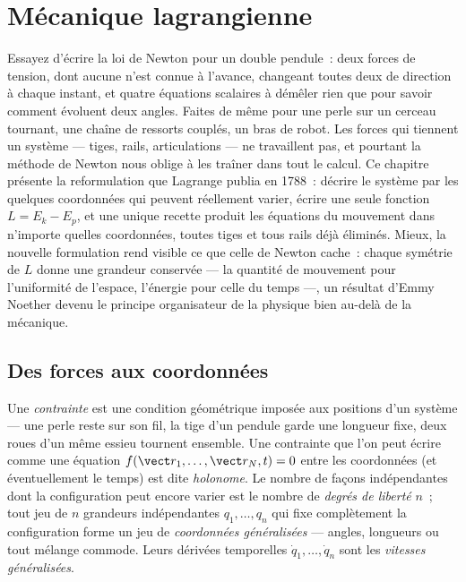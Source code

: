 \chapter{Mécanique lagrangienne}\label{ch:b3:lagrangian-mechanics}

Essayez d'écrire la loi de Newton pour un double pendule~: deux forces
de tension, dont aucune n'est connue à l'avance, changeant toutes deux
de direction à chaque instant, et quatre équations scalaires à démêler
rien que pour savoir comment évoluent deux angles. Faites de même pour
une perle sur un cerceau tournant, une chaîne de ressorts couplés, un
bras de robot. Les forces qui tiennent un système --- tiges, rails,
articulations --- ne travaillent pas, et pourtant la méthode de Newton
nous oblige à les traîner dans tout le calcul. Ce chapitre présente la
reformulation que Lagrange publia en 1788~: décrire le système par les
quelques coordonnées qui peuvent réellement varier, écrire une seule
fonction $L = E_k - E_p$, et une unique recette produit les équations
du mouvement dans n'importe quelles coordonnées, toutes tiges et tous
rails déjà éliminés. Mieux, la nouvelle formulation rend visible ce que
celle de Newton cache~: chaque symétrie de $L$ donne une grandeur
conservée --- la quantité de mouvement pour l'uniformité de l'espace,
l'énergie pour celle du temps ---, un résultat d'Emmy Noether devenu le
principe organisateur de la physique bien au-delà de la mécanique.

\section{Des forces aux coordonnées}

\begin{definition}\label{def:b3:lagrangian-mechanics:coordinates}
Une \emph{contrainte} est une condition géométrique imposée aux
positions d'un système --- une perle reste sur son fil, la tige d'un
pendule garde une longueur fixe, deux roues d'un même essieu tournent
ensemble. Une contrainte que l'on peut écrire comme une équation
$f(\vect r_1, \dots, \vect r_N, t) = 0$ entre les coordonnées (et
éventuellement le temps) est dite \emph{holonome}. Le nombre de façons
indépendantes dont la configuration peut encore varier est le nombre de
\emph{degrés de liberté} $n$~; tout jeu de $n$ grandeurs indépendantes
$q_1, \dots, q_n$ qui fixe complètement la configuration forme un jeu
de \emph{coordonnées généralisées} --- angles, longueurs ou tout
mélange commode. Leurs dérivées temporelles $\dot q_1, \dots, \dot q_n$
sont les \emph{vitesses généralisées}.
\end{definition}

